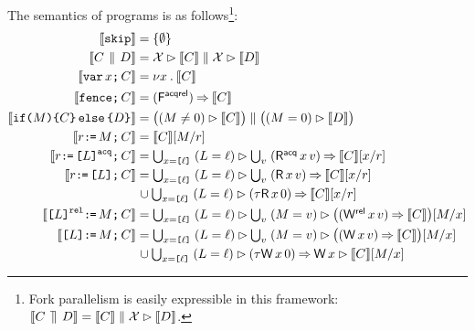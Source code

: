 The semantics of programs is as follows\footnote{Fork parallelism is easily expressible in this
  framework:
  $\llbracket C \,\mathbin{\rrceil}\, D\rrbracket = \llbracket C\rrbracket \parallel \mathcal{X} \mathbin\rhd
  \llbracket D\rrbracket$.}:
\allowdisplaybreaks
\begin{align*}
  \sem{\SKIP} & =
  \{ \emptyset \}
  \\
  \sem{\aCmd \PAR \bCmd} & =
  \Loc \guard \sem{\aCmd} \parallel \Loc \guard \sem{\bCmd} 
  \\
  \sem{\VAR\aLoc\SEMI \aCmd} & =
  \nu \aLoc \st \sem{\aCmd}
  \\
  \sem{\FENCE\SEMI \aCmd} & =
  (\DF{}) \prefix \sem{\aCmd}
  \\  
  \sem{\IF{\aExp} \THEN \aCmd \ELSE \bCmd \FI} & =
  \bigl((\aExp \neq 0) \guard \sem{\aCmd}\bigr) \parallel \bigl((\aExp=0) \guard \sem{\bCmd}\bigr) 
  \\
  \sem{\aReg\GETS\aExp\SEMI \aCmd} & =
  \sem{\aCmd}[\aExp/\aReg] 
  \\
  \sem{\aReg\GETS\REFAcq{\cExp}\SEMI \aCmd} & =
  \textstyle\bigcup_{\aLoc=\REF{\cVal}}\; ({\cExp}=\cVal) \guard \textstyle\bigcup_\aVal\; (\DRAcq\aLoc\aVal) \prefix \sem{\aCmd}[\aLoc/\aReg] 
  \\
  \sem{\aReg\GETS\REF{\cExp}\SEMI \aCmd} & =
  \textstyle\bigcup_{\aLoc=\REF{\cVal}}\; ({\cExp}=\cVal) \guard \textstyle\bigcup_\aVal\; (\DR\aLoc\aVal) \prefix \sem{\aCmd}[\aLoc/\aReg] 
  \\ & \mkern2mu\cup \textstyle\bigcup_{\aLoc=\REF{\cVal}}\; ({\cExp}=\cVal) \guard (\iDR{\aLoc}{0}) \prefix \sem{\aCmd}[\aLoc/\aReg]
  \\
  \sem{\REFRel{\cExp}\GETS\aExp\SEMI \aCmd} & =
  \textstyle\bigcup_{\aLoc=\REF{\cVal}}\; ({\cExp}=\cVal) \guard \textstyle\bigcup_\aVal\;  (\aExp=\aVal) \guard\bigl((\DWRel\aLoc\aVal) \prefix \sem{\aCmd}\bigr)[\aExp/\aLoc] 
  \\
  \sem{\REF{\cExp}\GETS\aExp\SEMI \aCmd} & =
  \textstyle\bigcup_{\aLoc=\REF{\cVal}}\; ({\cExp}=\cVal) \guard \textstyle\bigcup_\aVal\;  (\aExp=\aVal) \guard\bigl((\DW\aLoc\aVal) \prefix \sem{\aCmd}\bigr)[\aExp/\aLoc]
  \\ & \mkern2mu\cup \textstyle\bigcup_{\aLoc=\REF{\cVal}}\; ({\cExp}=\cVal) \guard (\iDW{\aLoc}{0}) \prefix \DW{\aLoc}{}\guard\sem{\aCmd}[\aExp/\aLoc]

\end{align*}
